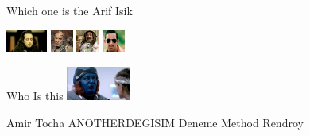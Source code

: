 \documentclass{exam}
\begin{document}
\begin{questions}
\question Which one is the Arif Isik\newline
\begin{oneparchoices}
\choice \includegraphics[height=2em]{komutanlogar.jpeg}
\choice \includegraphics[height=2em]{216.jpg}
\choice \includegraphics[height=2em]{faruk.jpg}
\choice \includegraphics[height=2em]{arifisik.jpg}
\end{oneparchoices}
\question Who Is this\newline
\includegraphics[height=3em]{rendroy2.jpg} \newline
\begin{oneparchoices}
\choice Amir Tocha
\choice ANOTHERDEGISIM
\choice Deneme Method
\choice Rendroy
\end{oneparchoices}
\end{questions}
\end{document}
